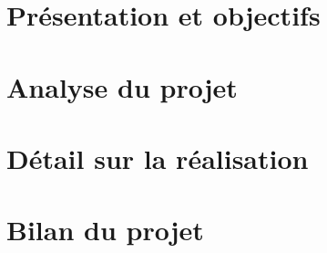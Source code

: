 \documentclass[a4paper,12pt]{report}
\begin{document}
		
	
	\tableofcontents	
		
	
	\part{Présentation et objectifs}
	
	
	
	\part{Analyse du projet}
	
	
	
	
	\part{Détail sur la réalisation}
	
	
	\part{Bilan du projet}
	
	
	

	
	
		
	\newpage
	\appendix
	
	
\end{document}
